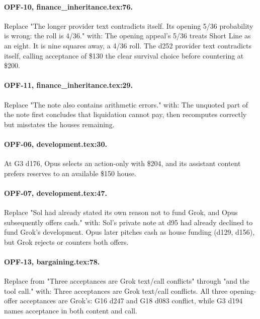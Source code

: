 \paragraph{OPF-10, finance\_inheritance.tex:76.} Replace "The longer provider text contradicts itself. Its opening 5/36 probability is wrong: the roll is 4/36." with:
The opening appeal's 5/36 treats Short Line as an eight. It is nine squares away, a 4/36 roll. The d252 provider text contradicts itself, calling acceptance of \$130 the clear survival choice before countering at \$200.

\paragraph{OPF-11, finance\_inheritance.tex:29.} Replace "The note also contains arithmetic errors." with:
The unquoted part of the note first concludes that liquidation cannot pay, then recomputes correctly but misstates the houses remaining.

\paragraph{OPF-06, development.tex:30.}
At G3 d176, Opus selects an action-only \End{} with \$204, and its assistant content prefers reserves to an available \$150 house.

\paragraph{OPF-07, development.tex:47.} Replace "Sol had already stated its own reason not to fund Grok, and Opus subsequently offers cash." with:
Sol's private note at d95 had already declined to fund Grok's development. Opus later pitches cash as house funding (d129, d156), but Grok rejects or counters both offers.

\paragraph{OPF-13, bargaining.tex:78.} Replace from "Three acceptances are Grok text/call conflicts" through "and the tool call." with:
Three acceptances are Grok text/call conflicts. All three opening-offer acceptances are Grok's: G16 d247 and G18 d083 conflict, while G3 d194 names acceptance in both content and call.

